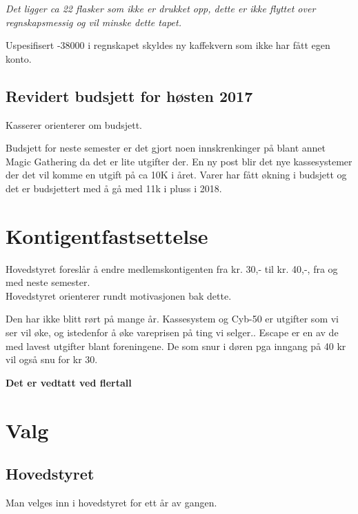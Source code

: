 \documentclass[10pt,norsk,a4paper]{article}
\begin{document}
\textit{Det ligger ca 22 flasker som ikke er drukket opp, dette er ikke
flyttet over regnskapsmessig og vil minske dette tapet.}

Uspesifisert -38000 i regnskapet skyldes ny kaffekvern som ikke har fått egen
konto.


\subsection{Revidert budsjett for høsten 2017}
Kasserer orienterer om budsjett.

Budsjett for neste semester er det gjort noen innskrenkinger på blant annet
Magic Gathering da det er lite utgifter der. 
En ny post blir det nye kassesystemer der det vil komme en utgift på ca 10K i
året.
Varer har fått økning i budsjett og det er budsjettert med å gå med 11k i
pluss i 2018.


\section{Kontigentfastsettelse}
Hovedstyret foreslår å endre medlemskontigenten fra kr. 30,- til kr. 40,-,
fra og med neste semester. \\
Hovedstyret orienterer rundt motivasjonen bak dette.

Den har ikke blitt rørt på mange år. Kassesystem og Cyb-50 er utgifter som vi
ser vil øke, og istedenfor å øke vareprisen på ting vi selger.. Escape er en
av de med lavest utgifter blant foreningene. De som snur i døren pga inngang
på 40 kr vil også snu for kr 30. 


\textbf{Det er vedtatt ved flertall}

\section{Valg}

\subsection{Hovedstyret}
Man velges inn i hovedstyret for ett år av gangen.
\end{document}
